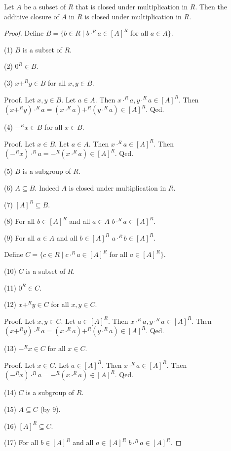 \documentclass[11pt]{article}
\begin{document}
\begin{forthel}
\begin{lemma}
Let $A$ be a subset of $R$ that is closed under multiplication in $R$.
Then the additive closure of $A$ in $R$ is closed under multiplication in $R$.
\end{lemma}

\begin{proof}
Define $B = \{b \in R \mid b \cdot^{R} a \in [A]^{R}$ for all $a \in A\}$.

(1) $B$ is a subset of $R$.

(2) $0^{R} \in B$.

(3) $x +^{R} y \in B$ for all $x,y \in B$.

Proof.
Let $x,y \in B$.
Let $a \in A$. Then $x \cdot^{R} a, y \cdot^{R} a \in [A]^{R}$.
Then $(x +^{R} y) \cdot^{R} a = (x \cdot^{R} a) +^{R} (y \cdot^{R} a) \in [A]^{R}$.
Qed.

(4) $-^{R} x \in B$ for all $x \in B$.

Proof.
Let $x \in B$.
Let $a \in A$. Then $x \cdot^{R} a \in [A]^{R}$.
Then $(-^{R} x) \cdot^{R} a = -^{R} (x\cdot^{R} a) \in [A]^{R}$.
Qed.

(5) $B$ is a subgroup of $R$.

(6) $A \subseteq B$. Indeed $A$ is closed under multiplication in $R$.

(7) $[A]^{R} \subseteq B$.

(8) For all $b \in [A]^{R}$ and all $a \in A$ $b \cdot^{R} a \in [A]^{R}$.

(9) For all $a \in A$ and all $b \in [A]^{R}$  $a \cdot^{R} b \in [A]^{R}$.

Define $C = \{c \in R \mid c \cdot^{R} a \in [A]^{R}$ for all $a \in [A]^{R}\}$.

(10) $C$ is a subset of $R$.

(11) $0^{R} \in C$.

(12) $x +^{R} y \in C$ for all $x,y \in C$.

Proof.
Let $x,y \in C$.
Let $a \in [A]^{R}$. Then $x \cdot^{R} a, y \cdot^{R} a \in [A]^{R}$.
Then $(x +^{R} y) \cdot^{R} a = (x \cdot^{R} a) +^{R} (y \cdot^{R} a) \in [A]^{R}$.
Qed.

(13) $-^{R} x \in C$ for all $x \in C$.

Proof.
Let $x \in C$.
Let $a \in [A]^{R}$. Then $x \cdot^{R} a \in [A]^{R}$.
Then $(-^{R} x) \cdot^{R} a = -^{R} (x\cdot^{R} a) \in [A]^{R}$.
Qed.

(14) $C$ is a subgroup of $R$.

(15) $A \subseteq C$ (by 9). 

(16) $[A]^{R} \subseteq C$.

(17) For all $b \in [A]^{R}$ and all $a \in [A]^{R}$ $b \cdot^{R} a \in [A]^{R}$.

\end{proof}
\end{forthel}
\end{document}
